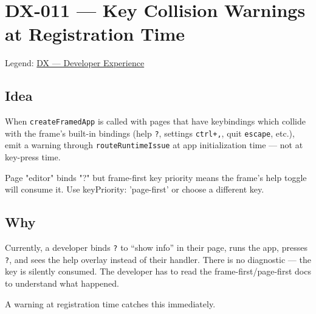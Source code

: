 \chapter{DX-011 --- Key Collision Warnings at Registration Time}\label{record-316}

\smallskip

Legend: \href{https://github.com/flyingrobots/bijou/blob/cbd70612140e7a450d764b3c7be1c6af878b99bc/docs/method/graveyard/legends/DX-developer-experience.md}{DX --- Developer Experience}

\section{Idea}\label{record-316-idea}

When \texttt{c\allowbreak{}r\allowbreak{}e\allowbreak{}a\allowbreak{}t\allowbreak{}e\allowbreak{}F\allowbreak{}r\allowbreak{}a\allowbreak{}m\allowbreak{}e\allowbreak{}d\allowbreak{}A\allowbreak{}p\allowbreak{}p} is called with pages that have keybindings which collide with the frame's built-in bindings (help \texttt{?}, settings \texttt{c\allowbreak{}t\allowbreak{}r\allowbreak{}l\allowbreak{}+\allowbreak{},}, quit \texttt{e\allowbreak{}s\allowbreak{}c\allowbreak{}a\allowbreak{}p\allowbreak{}e}, etc.), emit a warning through \texttt{r\allowbreak{}o\allowbreak{}u\allowbreak{}t\allowbreak{}e\allowbreak{}R\allowbreak{}u\allowbreak{}n\allowbreak{}t\allowbreak{}i\allowbreak{}m\allowbreak{}e\allowbreak{}I\allowbreak{}s\allowbreak{}s\allowbreak{}u\allowbreak{}e} at app initialization time --- not at key-press time.

\begin{CodeBlock}
 Page "editor" binds "?" but frame-first key
priority means the frame's help toggle will consume it. Use
keyPriority: 'page-first' or choose a different key.
\end{CodeBlock}

\section{Why}\label{record-316-why}

Currently, a developer binds \texttt{?} to ``show info'' in their page, runs the app, presses \texttt{?}, and sees the help overlay instead of their handler. There is no diagnostic --- the key is silently consumed. The developer has to read the frame-first/page-first docs to understand what happened.

A warning at registration time catches this immediately.

